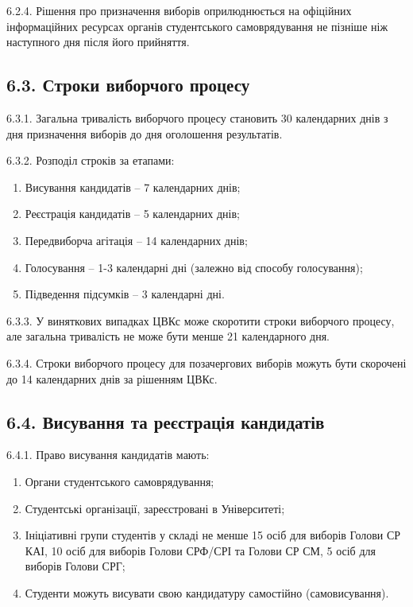     6.2.4. Рішення про призначення виборів оприлюднюється на офіційних інформаційних ресурсах органів студентського самоврядування не пізніше ніж наступного дня після його прийняття.

\subsection*{6.3. Строки виборчого процесу}
    6.3.1. Загальна тривалість виборчого процесу становить 30 календарних днів з дня призначення виборів до дня оголошення результатів.

    6.3.2. Розподіл строків за етапами:

        \begin{enumerate}[label=\alph*)]
            \item Висування кандидатів -- 7 календарних днів;
            \item Реєстрація кандидатів -- 5 календарних днів;
            \item Передвиборча агітація -- 14 календарних днів;
            \item Голосування -- 1-3 календарні дні (залежно від способу голосування);
            \item Підведення підсумків -- 3 календарні дні.
        \end{enumerate}

    6.3.3. У виняткових випадках ЦВКс може скоротити строки виборчого процесу, але загальна тривалість не може бути менше 21 календарного дня.

    6.3.4. Строки виборчого процесу для позачергових виборів можуть бути скорочені до 14 календарних днів за рішенням ЦВКс.

\subsection*{6.4. Висування та реєстрація кандидатів}
    6.4.1. Право висування кандидатів мають:

        \begin{enumerate}[label=\alph*)]
            \item Органи студентського самоврядування;
            \item Студентські організації, зареєстровані в Університеті;
            \item Ініціативні групи студентів у складі не менше 15 осіб для виборів Голови СР КАІ, 10 осіб для виборів Голови СРФ/СРІ та Голови СР СМ, 5 осіб для виборів Голови СРГ;
            \item Студенти можуть висувати свою кандидатуру самостійно (самовисування).
        \end{enumerate}

